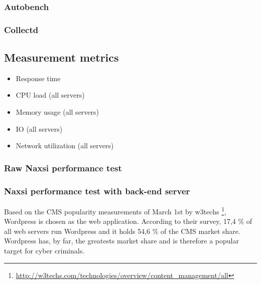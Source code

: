 \documentclass[Methods]{subfiles}
\begin{document}
\subsubsection{Autobench}


\subsubsection{Collectd}


\subsection{Measurement metrics}
\begin{itemize}
\item Response time
\item CPU load (all servers)
\item Memory usage (all servers)
\item IO (all servers)
\item Network utilization (all servers)
\end{itemize}

\subsubsection{Raw Naxsi performance test}

\subsubsection{Naxsi performance test with back-end server}
Based on the \ac{CMS} popularity measurements of March 1st by w3techs \footnote{\url{http://w3techs.com/technologies/overview/content_management/all}}, Wordpress is chosen as the web application. According to their survey, 17,4 \% of all web servers run Wordpress and it holds 54,6 \% of the CMS market share. Wordpress has, by far, the greatests market share and is therefore a popular target for cyber criminals.
\end{document}
